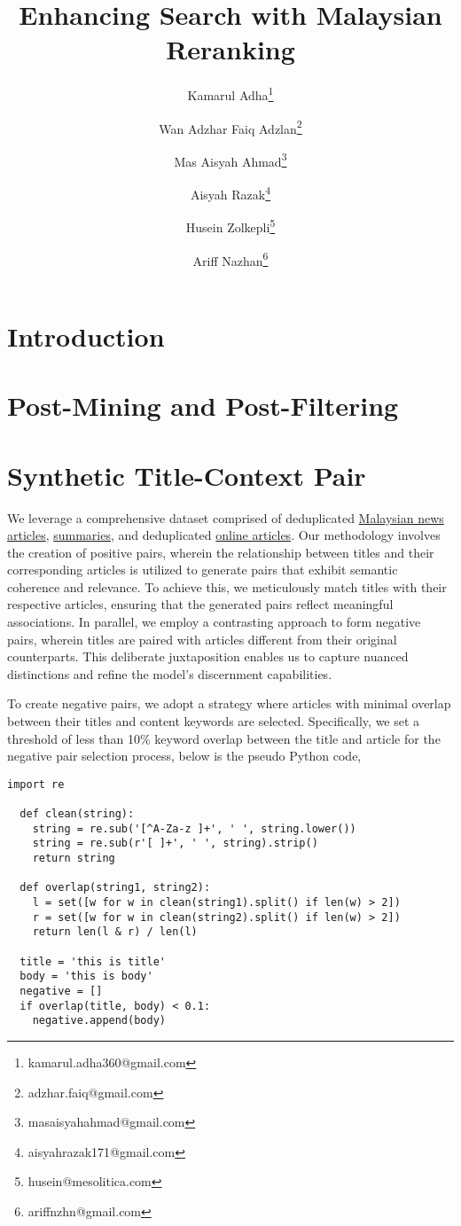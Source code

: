 \documentclass[preprint]{article}
\title{Enhancing Search with Malaysian Reranking}
\author{
  Kamarul Adha\thanks{kamarul.adha360@gmail.com} \and
  Wan Adzhar Faiq Adzlan\thanks{adzhar.faiq@gmail.com} \and
  Mas Aisyah Ahmad\thanks{masaisyahahmad@gmail.com} \and
  Aisyah Razak\thanks{aisyahrazak171@gmail.com} \and
  Husein Zolkepli\thanks{husein@mesolitica.com} \and
  Ariff Nazhan\thanks{ariffnzhn@gmail.com}
}
\begin{document}
\maketitle

\begin{abstract}


\end{abstract}

\section{Introduction}

\section{Post-Mining and Post-Filtering}

\section{Synthetic Title-Context Pair}

We leverage a comprehensive dataset comprised of deduplicated \href{https://huggingface.co/datasets/malaysia-ai/dedup-text-dataset}{Malaysian news articles}, \href{https://huggingface.co/datasets/mesolitica/mixtral-malaysian-abstractive-summarization}{summaries}, and deduplicated \href{https://huggingface.co/datasets/malaysia-ai/dedup-text-dataset}{online articles}. Our methodology involves the creation of positive pairs, wherein the relationship between titles and their corresponding articles is utilized to generate pairs that exhibit semantic coherence and relevance. To achieve this, we meticulously match titles with their respective articles, ensuring that the generated pairs reflect meaningful associations. In parallel, we employ a contrasting approach to form negative pairs, wherein titles are paired with articles different from their original counterparts. This deliberate juxtaposition enables us to capture nuanced distinctions and refine the model's discernment capabilities.

To create negative pairs, we adopt a strategy where articles with minimal overlap between their titles and content keywords are selected. Specifically, we set a threshold of less than 10\% keyword overlap between the title and article for the negative pair selection process, below is the pseudo Python code,

\begin{lstlisting}[breaklines=true]
  import re

  def clean(string):
    string = re.sub('[^A-Za-z ]+', ' ', string.lower())
    string = re.sub(r'[ ]+', ' ', string).strip()
    return string

  def overlap(string1, string2):
    l = set([w for w in clean(string1).split() if len(w) > 2])
    r = set([w for w in clean(string2).split() if len(w) > 2])
    return len(l & r) / len(l)

  title = 'this is title'
  body = 'this is body'
  negative = []
  if overlap(title, body) < 0.1:
    negative.append(body)
\end{lstlisting}
\end{document}
